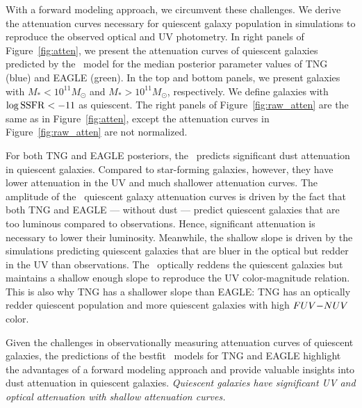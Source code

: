 With a forward modeling approach, we circumvent these challenges. We derive the 
attenuation curves necessary for quiescent galaxy population in simulations to
reproduce the observed optical and UV photometry.  In right panels of
Figure~\ref{fig:atten}, we present the attenuation curves of quiescent galaxies 
predicted by the \eda~model for the median posterior parameter values of TNG (blue) 
and EAGLE (green). In the top and bottom panels, we present galaxies with 
$M_* < 10^{11} M_\odot$ and $M_* > 10^{11} M_\odot$, respectively. 
We define galaxies with $\log {\rm SSFR} < -11$ as quiescent. The right panels 
of Figure~\ref{fig:raw_atten} are the same as in Figure~\ref{fig:atten}, except
the attenuation curves in Figure~\ref{fig:raw_atten} are not normalized. 

For both TNG and EAGLE posteriors, the \eda~predicts significant dust attenuation 
in quiescent galaxies. Compared to star-forming galaxies, however, they have 
lower attenuation in the UV and much shallower attenuation curves. The amplitude 
of the \eda~quiescent galaxy attenuation curves is driven by the fact that both
TNG and EAGLE --- without dust --- predict quiescent galaxies that are too 
luminous compared to observations. Hence, significant attenuation is necessary 
to lower their luminosity. Meanwhile, the shallow slope is driven by the
simulations predicting quiescent galaxies that are bluer in the optical but
redder in the UV than observations. The \eda~optically reddens the quiescent
galaxies but maintains a shallow enough slope to reproduce the UV
color-magnitude relation. This is also why TNG has a shallower slope than
EAGLE: TNG has an optically redder quiescent population and more quiescent
galaxies with high $FUV{-}NUV$ color. 

Given the challenges in observationally measuring attenuation curves of quiescent
galaxies, the predictions of the bestfit \eda~models for TNG and EAGLE
highlight the advantages of a forward modeling approach and provide valuable 
insights into dust attenuation in quiescent galaxies. \emph{Quiescent galaxies
have significant UV and optical attenuation with shallow attenuation curves.} 

